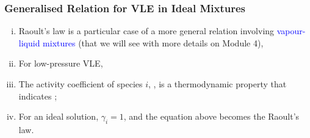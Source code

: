 \documentclass[10pt,compress,unknownkeysallowed]{beamer}
\begin{document}
\begin{frame}
  \frametitle{Generalised Relation for VLE in Ideal Mixtures}
  \begin{enumerate}[i)]
      \item<1-> Raoult's law is a particular case of a more general relation involving \textcolor{blue}{vapour-liquid mixtures} (that we will see with more details on Module 4),
      \item<3-> For low-pressure VLE,
      \item<4-> The activity  coefficient of species $i$, , is a thermodynamic property that indicates ;
      \item<4-> For an ideal solution, $\gamma_{i}=1$, and the equation above becomes the Raoult's law.  
  \end{enumerate}
\end{frame}
\end{document}
